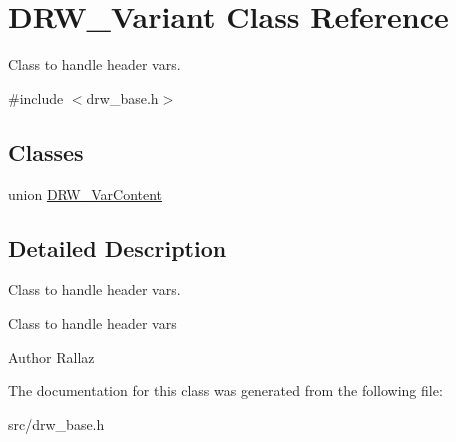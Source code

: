 \hypertarget{class_d_r_w___variant}{}\section{D\+R\+W\+\_\+\+Variant Class Reference}
\label{class_d_r_w___variant}


Class to handle header vars.  




{\ttfamily \#include $<$drw\+\_\+base.\+h$>$}

\subsection*{Classes}
\begin{DoxyCompactItemize}
\item 
union \hyperlink{union_d_r_w___variant_1_1_d_r_w___var_content}{D\+R\+W\+\_\+\+Var\+Content}
\end{DoxyCompactItemize}


\subsection{Detailed Description}
Class to handle header vars. 

Class to handle header vars \begin{DoxyAuthor}{Author}
Rallaz 
\end{DoxyAuthor}


The documentation for this class was generated from the following file\+:\begin{DoxyCompactItemize}
\item 
src/drw\+\_\+base.\+h\end{DoxyCompactItemize}
